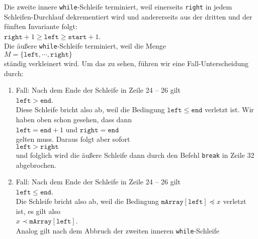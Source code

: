 Die zweite innere
\texttt{while}-Schleife terminiert, weil einerseits \texttt{right} in jedem Schleifen-Durchlauf
dekrementiert wird und andererseits aus der dritten und der f\"unften Invariante folgt: \\[0.2cm]
\hspace*{1.3cm} $\texttt{right} + 1\geq \texttt{left} \geq \mathtt{start} + 1$. \\[0.2cm]
Die \"au{\ss}ere \texttt{while}-Schleife terminiert, weil die Menge \\[0.2cm]
\hspace*{1.3cm} $M = \{ \mathtt{left}, \cdots, \mathtt{right} \}$ \\[0.2cm]
st\"andig verkleinert wird.  Um das zu sehen, f\"uhren wir eine Fall-Unterscheidung durch:
\begin{enumerate}
\item Fall: Nach dem Ende der Schleife in Zeile 24 -- 26 gilt \\[0.2cm]
      \hspace*{1.3cm} $\mathtt{left} > \mathtt{end}$. \\[0.2cm]
      Diese Schleife bricht also ab, weil die Bedingung $\mathtt{left} \leq \mathtt{end}$
      verletzt ist.  Wir haben oben schon gesehen, dass dann \\[0.2cm]
      \hspace*{1.3cm} 
      $\texttt{left} = \mathtt{end} + 1$ \quad und \quad $\mathtt{right} = \mathtt{end}$
      \\[0.2cm]
      gelten muss.  Daraus folgt aber sofort \\[0.2cm]
      \hspace*{1.3cm} $\mathtt{left} > \mathtt{right}$ \\[0.2cm]
      und folglich wird die \"au{\ss}ere Schleife dann durch den Befehl \texttt{break} in Zeile 32 abgebrochen.
\item Fall: Nach dem Ende der Schleife in Zeile 24 -- 26 gilt \\[0.2cm]
      \hspace*{1.3cm} $\mathtt{left} \leq \mathtt{end}$. \\[0.2cm]
      Die Schleife bricht also ab, weil die Bedingung 
      $\mathtt{mArray}[\mathtt{left}] \preceq x$ verletzt ist, es gilt also \\[0.2cm]
      \hspace*{1.3cm} $x \prec \mathtt{mArray}[\mathtt{left}]$. \\[0.2cm]
      Analog gilt nach dem Abbruch der zweiten inneren \texttt{while}-Schleife \\[0.2cm]

\end{enumerate}
